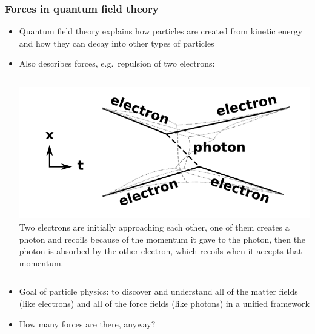 \documentclass[compress]{beamer}
\begin{document}
\begin{frame}
\frametitle{Forces in quantum field theory}
\begin{itemize}
\item Quantum field theory explains how particles are created from
  kinetic energy and how they can decay into other types of particles

\vspace{0.25 cm}
\item Also describes forces, e.g.\ repulsion of two electrons:

\vspace{0.5 cm}
\begin{columns}
\includegraphics[width=\linewidth]{forces.png}
\scriptsize
Two electrons are initially approaching each other, one of them
creates a photon and recoils because of the momentum it gave to the
photon, then the photon is absorbed by the other electron, which
recoils when it accepts that momentum.
\end{columns}

\vspace{0.5 cm}
\item Goal of particle physics: to discover and understand all of the
  matter fields (like electrons) and all of the force fields (like
  photons) in a unified framework

\item How many forces are there, anyway?
\end{itemize}
\end{frame}
\end{document}
